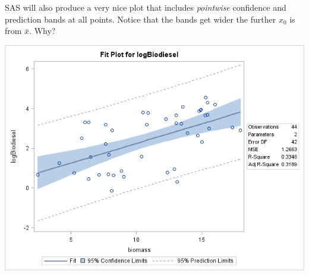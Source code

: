 \newpage


SAS will also produce a very nice plot that includes \textit{pointwise} confidence and prediction bands at all points. Notice that the bands get wider the further $x_0$ is from $\bar{x}$.  Why?

\begin{center}
\includegraphics[scale=0.55]{biofitpred}
\end{center}

